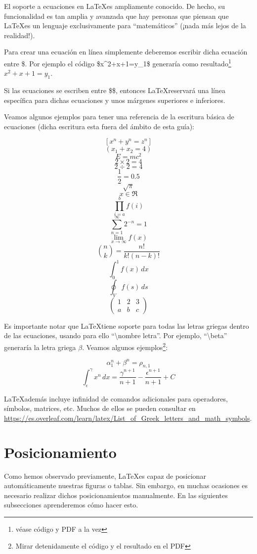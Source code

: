El soporte a ecuaciones en \LaTeX es ampliamente conocido. De hecho, su funcionalidad es tan amplia y avanzada que hay personas que piensan que \LaTeX es un lenguaje exclusivamente para ``matemáticos'' (¡nada más lejos de la realidad!).

Para crear una ecuación en línea simplemente deberemos escribir dicha ecuación entre \$. Por ejemplo el código \$x\^{}2+x+1=y\_1\$ generaría como resultado\footnote{véase código y PDF a la vez} $x^2+x+1=y_1$.

Si las ecuaciones se escriben entre \$\$, entonces \LaTeX reservará una línea específica para dichas ecuaciones y unos márgenes superiores e inferiores.

Veamos algunos ejemplos para tener una referencia de la escritura básica de ecuaciones (dicha escritura esta fuera del ámbito de esta guía):

$$[ x^n + y^n = z^n ]$$
$$( x_1+x_2=4 )$$
$$E=mc^2$$
$$2\times 2 = 4$$
$$2\div 2 = 4$$
$$\frac{1}{2} = 0.5$$
$$\sqrt{\pi}$$
$$x \in \Re$$
$$\prod_{i=a}^{b} f(i) $$
$$\sum_{n=1}^{\infty} 2^{-n} = 1 $$
$$\lim_{x\to\infty} f(x)$$
$$\binom{n}{k} = \frac{n!}{k!(n-k)!}$$
$$\int_0^1 f(x) \,dx$$
$$\oint_V f(s) \,ds$$
$$\begin{pmatrix}
1 & 2 & 3\\
a & b & c
\end{pmatrix}$$

Es importante notar que \LaTeX tiene soporte para todas las letras griegas dentro de las ecuaciones, usando para ello ``\textbackslash nombre letra''. Por ejemplo, ``\textbackslash beta'' generaría la letra griega $\beta$. Veamos algunos ejemplos\footnote{Mirar detenidamente el código y el resultado en el PDF}:

$$\alpha^n_1 + \beta^n = \rho_{n,1}$$
$$\int_\epsilon^\gamma x^n \,dx = \frac{\gamma^{n+1}}{n+1} - \frac{\epsilon^{n+1}}{n+1} + C$$

\LaTeX además incluye infinidad de comandos adicionales para operadores, símbolos, matrices, etc. Muchos de ellos se pueden consultar en \url{https://es.overleaf.com/learn/latex/List_of_Greek_letters_and_math_symbols}.

\section{Posicionamiento}

Como hemos observado previamente, \LaTeX es capaz de posicionar automáticamente nuestras figuras o tablas. Sin embargo, en muchas ocasiones es necesario realizar dichos posicionamientos manualmente. En las siguientes subsecciones aprenderemos cómo hacer esto.

